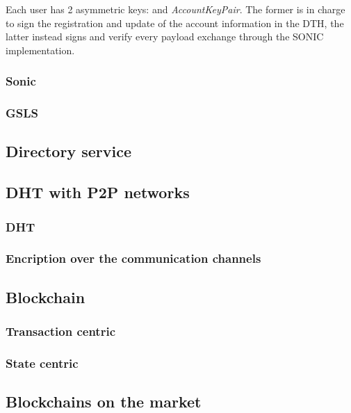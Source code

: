 Each user has 2 asymmetric keys:  and \textit{AccountKeyPair}. The former is in charge to sign the registration and update of the account information in the DTH, the latter instead signs and verify every payload exchange through the SONIC implementation.








\subsubsection{Sonic}
\subsubsection{GSLS}


\subsection{Directory service}



\subsection{DHT with P2P networks}

\subsubsection{DHT}

\subsubsection{Encription over the communication channels}




\subsection{Blockchain}


\subsubsection{Transaction centric}
\subsubsection{State centric}



\subsection{Blockchains on the market}

